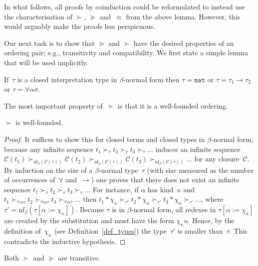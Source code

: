 \documentclass[a4paper,UKenglish,cleveref,autoref,numberwithinsect]{lipics-v2019}
\theoremstyle{definition}
\newcommand{\arrtype}{\rightarrow}
\newcommand{\tapp}[2]{#1 * #2}
\newcommand{\subst}[2]{#1:=#2}
\newcommand{\nat}{\mathtt{nat}}
\newcommand{\cl}{\mathcal{C}}
\newcommand{\nf}{\mathrm{nf}}
\begin{document}
In what follows, all proofs by coinduction could be reformulated to
instead use the characterisation of $\succ$, $\succeq$ and~$\approx$
from the above lemma. However, this would arguably make the proofs
less perspicuous.

Our next task is to show that $\succeq$ and $\succ$ have the
desired properties of an ordering pair; e.g., transitivity and
compatibility. We first state a simple lemma that will be used
implicitly.

\begin{lemma}
  If~$\tau$ is a closed interpretation type in $\beta$-normal form
  then $\tau = \nat$ or $\tau = \tau_1\arrtype\tau_2$ or $\tau =
  \forall\alpha\sigma$.
\end{lemma}

The most important property of~$\succ$ is that it is a well-founded
ordering.

\begin{lemma}\label{lem_well_founded}
  $\succ$ is well-founded.
\end{lemma}

\begin{proof}
  It suffices to show this for closed terms and closed types in
  $\beta$-normal form, because any infinite sequence $t_1 \succ_\tau
  t_2 \succ_\tau t_3 \succ_\tau \ldots$ induces an infinite sequence
  $\cl(t_1) \succ_{\nf_\beta(\cl(\tau))} \cl(t_2)
  \succ_{\nf_\beta(\cl(\tau))} \cl(t_3) \succ_{\nf_\beta(\cl(\tau))}
  \ldots$ for any closure~$\cl$. By induction on the size of a
  $\beta$-normal type~$\tau$ (with size measured as the number of
  occurrences of~$\forall$ and~$\arrtype$) one proves that there does
  not exist an infinite sequence $t_1 \succ_\tau t_2 \succ_\tau t_3
  \succ_\tau \ldots$ For instance, if $\alpha$ has kind~$\kappa$ and
  $t_1 \succ_{\forall\alpha\tau} t_2 \succ_{\forall\alpha\tau} t_3
  \succ_{\forall\alpha\tau} \ldots$ then $\tapp{t_1}{\chi_\kappa}
  \succ_{\tau'} \tapp{t_2}{\chi_\kappa} \succ_{\tau'}
  \tapp{t_3}{\chi_\kappa} \succ_{\tau'} \ldots$, where
  $\tau'=\nf_\beta(\tau[\subst{\alpha}{\chi_\kappa}])$. Because $\tau$
  is in $\beta$-normal form, all redexes in
  $\tau[\subst{\alpha}{\chi_\kappa}]$ are created by the substitution
  and must have the form $\chi_\kappa u$. Hence, by the definition
  of~$\chi_\kappa$ (see Definition~\ref{def_types}) the
  type~$\tau'$ is smaller than~$\tau$. This
  contradicts the inductive hypothesis.
\end{proof}

\begin{lemma}\label{lem_transitive}
  Both $\succ$ and $\succeq$ are transitive.
\end{lemma}
\end{document}
